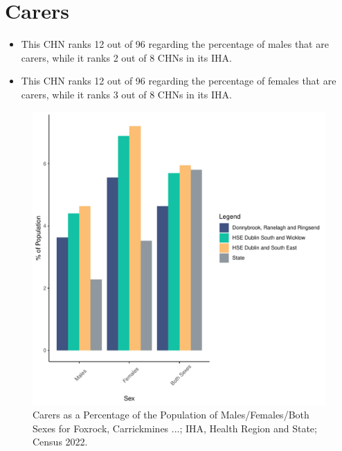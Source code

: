 \documentclass{article}
\begin{document}
\section{Carers}\label{sect:Carers}
\begin{itemize}
\item This CHN ranks  12 out of 96 regarding the percentage of males that are carers, while it ranks   2 out of 8 CHNs in its IHA.
\item This CHN ranks  12 out of 96 regarding the percentage of females that are carers, while it ranks   3 out of 8 CHNs in its IHA.
\end{itemize}
\begin{figure}[H]
	\centering
	\includegraphics[width = 150mm]{../figures/CareED.pdf}
	\caption{Carers as a Percentage of the Population of Males/Females/Both Sexes for Foxrock, Carrickmines ...; IHA, Health Region and State; Census 2022.}
	\label{fig:2ae19629-1a6a-13a3-e055-000000000001}
	\end{figure}
\end{document}
